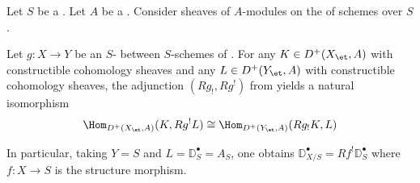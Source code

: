 \begin{proposition} \label{proposition:local_verdier_duality_pairing_for_compactifiable_morphisms_with_torsion_coefficients}
    Let $S$ be a . Let $A$ be a  . Consider sheaves of $A$-modules on the  of schemes over $S$.

    Let $g: X \to Y$ be an $S$- between $S$-schemes of . For any $K \in D^+(X_{\et}, A)$ with constructible cohomology sheaves and any $L \in D^+(Y_{\et}, A)$ with constructible cohomology sheaves, the adjunction $(Rg_!, Rg^!)$ from  yields a natural isomorphism
    $$\Hom_{D^+(X_{\et}, A)}(K, Rg^! L) \cong \Hom_{D^+(Y_{\et}, A)}(Rg_! K, L)$$

    In particular, taking $Y = S$ and $L = \mathbb{D}_S^\bullet = A_S$, one obtains $\mathbb{D}_{X/S}^\bullet = Rf^! \mathbb{D}_S^\bullet$ where $f: X \to S$ is the structure morphism.
\end{proposition}
